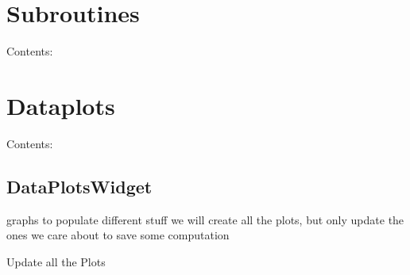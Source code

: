 \documentclass[letterpaper,10pt,english]{sphinxmanual}
\begin{document}
\chapter{Subroutines}
\label{Subroutines::doc}\label{Subroutines:subroutines}
Contents:


\chapter{Dataplots}
\label{Dataplots:dataplots}\label{Dataplots::doc}
Contents:


\section{DataPlotsWidget}
\label{DataPlotsWidget:dataplotswidget}\label{DataPlotsWidget::doc}

\begin{fulllineitems}
\label{DataPlotsWidget:Dataplots.DataPlotsWidget}
graphs to populate different stuff
we will create all the plots, but only update the ones we care about
to save some computation

\begin{fulllineitems}
\label{DataPlotsWidget:Dataplots.DataPlotsWidget.change_key}
\end{fulllineitems}


\begin{fulllineitems}
\label{DataPlotsWidget:Dataplots.DataPlotsWidget.emit_it}
\end{fulllineitems}


\begin{fulllineitems}
\label{DataPlotsWidget:Dataplots.DataPlotsWidget.message}
\end{fulllineitems}


\begin{fulllineitems}
\label{DataPlotsWidget:Dataplots.DataPlotsWidget.update_plots}
Update all the Plots

\end{fulllineitems}


\end{fulllineitems}
\end{document}
